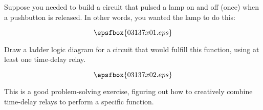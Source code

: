 

Suppose you needed to build a circuit that pulsed a lamp on and off (once) when a pushbutton is released.  In other words, you wanted the lamp to do this:

$$\epsfbox{03137x01.eps}$$

Draw a ladder logic diagram for a circuit that would fulfill this function, using at least one time-delay relay.







$$\epsfbox{03137x02.eps}$$







This is a good problem-solving exercise, figuring out how to creatively combine time-delay relays to perform a specific function.




